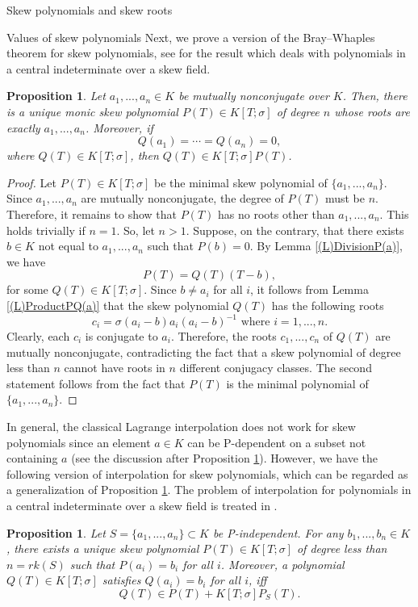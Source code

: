 \documentclass[11pt,a4paper]{article}
\theoremstyle{theorem}
\newtheorem{proposition}[theorem]{Proposition}
\numberwithin{equation}{section}
\newcommand{\s}{\sigma}
\begin{document}
\begin{section}{Skew polynomials and skew roots}
\begin{subsection}{Values of skew polynomials}
	Next, we prove a version of the Bray--Whaples theorem for skew polynomials, see \cite{braywhaples1983polynomials} for the result which deals with polynomials in a central indeterminate over a skew field. 
	\begin{proposition}\label{(P)Bray_Whaples}
		Let $a_1,...,a_n\in K$ be mutually nonconjugate over $K$. Then, there is a unique monic skew polynomial $P(T)\in K[T;\s]$ of degree $n$ whose roots are exactly $a_1,...,a_n$. Moreover,  if $$Q(a_1)=\cdots=Q(a_n)=0,$$ where  $Q(T)\in K[T;\s]$, then $Q(T)\in  K[T;\s]P(T)$.   
	\end{proposition}
	\begin{proof}
		Let $P(T)\in K[T;\s]$ be the minimal skew polynomial of $\{a_1,...,a_n\}$. Since $a_1,...,a_n$ are mutually nonconjugate, the degree of $P(T)$ must be $n$. Therefore, it remains to show that $P(T)$ has no  roots other than $a_1,...,a_n$. This holds trivially if $n=1$. So, let $n>1$. Suppose, on the contrary, that there exists $b\in K$ not equal to $a_1,...,a_n$ such that $P(b)=0$. By Lemma \ref{(L)DivisionP(a)}, we have
		$$P(T)=Q(T)(T-b),$$
		for some $Q(T)\in K[T;\s]$.  Since $b\neq a_i$ for all $i$, 
		it follows from Lemma \ref{(L)ProductPQ(a)} that  the skew polynomial $Q(T)$ has the following roots $$c_i=\sigma(a_i-b) a_i(a_i-b)^{-1} \text{ where } i=1,...,n.$$  Clearly, each $c_i$ is conjugate to $a_i$. Therefore, the roots $c_1,...,c_n$  of $Q(T)$ are mutually nonconjugate, contradicting the fact that a skew polynomial of degree less than $n$ cannot have roots in $n$ different conjugacy classes.  The second statement follows from the fact that $P(T)$ is the minimal  polynomial of $\{a_1,...,a_n\}$.  
	\end{proof}
	In general, the classical Lagrange interpolation does not work for skew polynomials since an element $a\in K$ can be P-dependent on a subset not containing $a$ (see the discussion after Proposition \ref{(P)Interpolation}). However, we have the following version of interpolation for skew polynomials, which can be regarded as a generalization of Proposition \ref{(P)Bray_Whaples}. The problem of interpolation for polynomials in a central indeterminate over a skew field is treated in \cite{bolotnikov2020lagrange}.
	 \begin{proposition}\label{(P)Interpolation}
	 	Let $S=\{a_1,...,a_n\}\subset K$ be P-independent. For any $b_1,...,b_n\in K$,  there  exists a unique skew polynomial $P(T)\in K[T;\s]$ of degree less than $n=rk (S)$ such that $P(a_i)=b_i$ for all $i$. Moreover, a  polynomial $Q(T)\in K[T;\s]$  satisfies $Q(a_i)=b_i$ for all $i$, iff $$Q(T)\in P(T)+K[T;\s]P_S(T).$$

\end{proposition}
\end{subsection}
\end{section}
\end{document}
